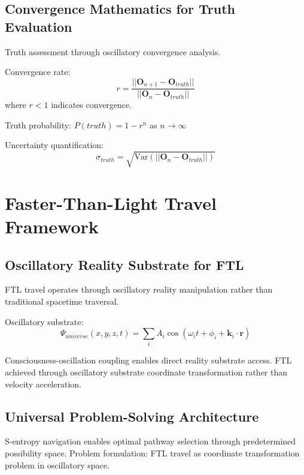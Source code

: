 \documentclass[12pt,a4paper]{article}
\begin{document}
\subsection{Convergence Mathematics for Truth Evaluation}

Truth assessment through oscillatory convergence analysis.

Convergence rate:
\begin{equation}
r = \frac{||\mathbf{O}_{n+1} - \mathbf{O}_{truth}||}{||\mathbf{O}_n - \mathbf{O}_{truth}||}
\end{equation}
where $r < 1$ indicates convergence.

Truth probability: $P(truth) = 1 - r^n$ as $n \to \infty$

Uncertainty quantification:
\begin{equation}
\sigma_{truth} = \sqrt{\text{Var}(||\mathbf{O}_n - \mathbf{O}_{truth}||)}
\end{equation}

\section{Faster-Than-Light Travel Framework}

\subsection{Oscillatory Reality Substrate for FTL}

FTL travel operates through oscillatory reality manipulation rather than traditional spacetime traversal.

Oscillatory substrate:
\begin{equation}
\Psi_{universe}(x,y,z,t) = \sum_{i} A_i \cos(\omega_i t + \phi_i + \mathbf{k}_i \cdot \mathbf{r})
\end{equation}

Consciousness-oscillation coupling enables direct reality substrate access. FTL achieved through oscillatory substrate coordinate transformation rather than velocity acceleration.

\subsection{Universal Problem-Solving Architecture}

S-entropy navigation enables optimal pathway selection through predetermined possibility space. Problem formulation: FTL travel as coordinate transformation problem in oscillatory space.
\end{document}
